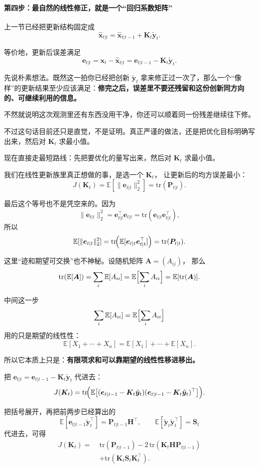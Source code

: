 \documentclass[12pt,a4paper]{ctexart}
\begin{document}
\paragraph{第四步：最自然的线性修正，就是一个“回归系数矩阵”}

上一节已经把更新结构固定成
\[
\hat{\bm{x}}_{t|t}
= \hat{\bm{x}}_{t|t-1} + \bm{K}_t\tilde{\bm{y}}_t.
\]

等价地，更新后误差满足
\[
\bm{e}_{t|t}
= \bm{x}_t - \hat{\bm{x}}_{t|t}
= \bm{e}_{t|t-1} - \bm{K}_t\tilde{\bm{y}}_t.
\]

先说朴素想法。既然这一拍你已经把创新
\(\tilde{\bm{y}}_t\)
拿来修正过一次了，那么一个“像样”的更新结果至少应该满足：\textbf{修完之后，误差里不要还残留和这份创新同方向的、可继续利用的信息。}

不然就说明这次观测里还有东西没用干净，你还可以顺着同一份残差继续往下修。

不过这句话目前还只是直觉，不是证明。真正严谨的做法，还是把优化目标明确写出来，然后对
\(\bm{K}_t\)
求最小值。

现在直接走最短路线：先把要优化的量写出来，然后对
\(\bm{K}_t\)
求最小值。

我们在线性更新族里真正想做的事，是选一个
\(\bm{K}_t\)，
让更新后的均方误差最小：
\[
J(\bm{K}_t)
= \mathbb{E}[\|\bm{e}_{t|t}\|_2^2]
= \mathrm{tr}(\bm{P}_{t|t}).
\]

最后这个等号也不是凭空来的。因为
\[
\|\bm{e}_{t|t}\|_2^2
= \bm{e}_{t|t}^\top \bm{e}_{t|t}
= \mathrm{tr}(\bm{e}_{t|t}\bm{e}_{t|t}^\top),
\]
所以
\[
\mathbb{E}[\|\bm{e}_{t|t}\|_2^2]
= \mathrm{tr}\!\Bigl(
\mathbb{E}[\bm{e}_{t|t}\bm{e}_{t|t}^\top]
\Bigr)
= \mathrm{tr}(\bm{P}_{t|t}).
\]

这里“迹和期望可交换”也不神秘。设随机矩阵
\(\bm{A}=(A_{ij})\)，
那么
\[
\mathrm{tr}(\mathbb{E}[\bm{A}])
= \sum_i \mathbb{E}[A_{ii}]
= \mathbb{E}\Bigl[\sum_i A_{ii}\Bigr]
= \mathbb{E}[\mathrm{tr}(\bm{A})].
\]

中间这一步
\[
\sum_i \mathbb{E}[A_{ii}]
= \mathbb{E}\Bigl[\sum_i A_{ii}\Bigr]
\]
用的只是期望的线性性：
\[
\mathbb{E}[X_1+\cdots+X_n]
= \mathbb{E}[X_1]+\cdots+\mathbb{E}[X_n].
\]

所以它本质上只是：\textbf{有限项求和可以靠期望的线性性移进移出。}

把
\(\bm{e}_{t|t} = \bm{e}_{t|t-1} - \bm{K}_t\tilde{\bm{y}}_t\)
代进去：
\[
J(\bm{K}_t)
= \mathrm{tr}\!\Bigl(
\mathbb{E}\bigl[
(\bm{e}_{t|t-1} - \bm{K}_t\tilde{\bm{y}}_t)
(\bm{e}_{t|t-1} - \bm{K}_t\tilde{\bm{y}}_t)^\top
\bigr]
\Bigr).
\]

把括号展开，再把前两步已经算出的
\[
\mathbb{E}[\bm{e}_{t|t-1}\tilde{\bm{y}}_t^\top]
= \bm{P}_{t|t-1}\bm{H}^\top,
\qquad
\mathbb{E}[\tilde{\bm{y}}_t\tilde{\bm{y}}_t^\top]
= \bm{S}_t
\]
代进去，可得
\[
\begin{aligned}
J(\bm{K}_t)
=\;&
\mathrm{tr}(\bm{P}_{t|t-1})
- 2\,\mathrm{tr}(\bm{K}_t\bm{H}\bm{P}_{t|t-1}) \\
&+ \mathrm{tr}(\bm{K}_t\bm{S}_t\bm{K}_t^\top).
\end{aligned}
\]
\end{document}
